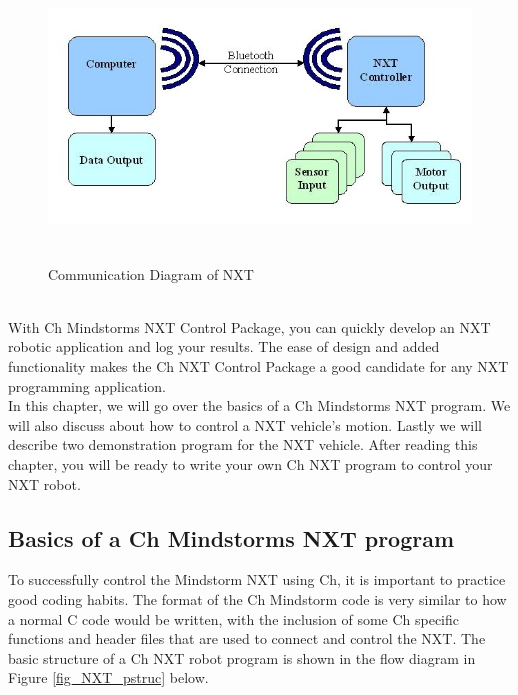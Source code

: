 \documentclass[12pt]{article}
\begin{document}
\begin{figure}[h]
  \begin{center}
    \includegraphics[height=3in]{figure/mindstorm/NXT_connect.png}
    \caption{Communication Diagram of NXT\label{fig_NXT_comm}}
  \end{center}
\end{figure}
\\
With Ch Mindstorms NXT Control Package, you can quickly develop an NXT robotic application and log your 
results. The ease of design and added functionality makes the Ch NXT Control Package a good candidate for 
any NXT programming application.
\newline
\\
In this chapter, we will go over the basics of a Ch Mindstorms NXT program. We will also discuss about 
how to control a NXT vehicle's motion. Lastly we will describe two demonstration program for the NXT vehicle. 
After reading this chapter, you will be ready to write your own Ch NXT program to control your NXT robot.

\subsection{Basics of a Ch Mindstorms NXT program}

To successfully control the Mindstorm NXT using Ch, it is important to practice good 
coding habits. The format of the Ch Mindstorm code is very similar to how a normal C
code would be written, with the inclusion of some Ch specific functions and header files 
that are used to connect and control the NXT. The basic structure of a Ch NXT robot 
program is shown in the flow diagram in Figure
    \ref{fig_NXT_pstruc} below.
\end{document}
